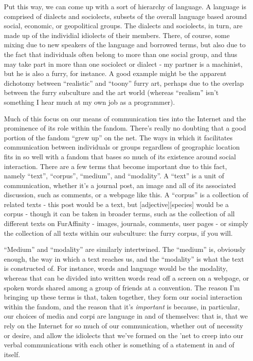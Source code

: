 Put this way, we can come up with a sort of hierarchy of language. A
language is comprised of dialects and sociolects, subsets of the overall
language based around social, economic, or geopolitical groups. The
dialects and sociolects, in turn, are made up of the individial
idiolects of their members. There, of course, some mixing due to new
speakers of the language and borrowed terms, but also due to the fact
that individuals often belong to more than one social group, and thus
may take part in more than one sociolect or dialect - my partner is a
machinist, but he is also a furry, for instance. A good example might be
the apparent dichotomy between ``realistic'' and ``toony'' furry art,
perhaps due to the overlap between the furry subculture and the art
world (whereas ``realism'' isn't something I hear much at my own job as
a programmer).

Much of this focus on our means of communication ties into the Internet
and the prominence of its role within the fandom. There's really no
doubting that a good portion of the fandom ``grew up'' on the net. The
ways in which it facilitates communication between individuals or groups
regardless of geographic location fits in so well with a fandom that
bases so much of its existence around social interaction. There are a
few terms that become important due to this fact, namely ``text'',
``corpus'', ``medium'', and ``modality''. A ``text'' is a unit of
communication, whether it's a journal post, an image and all of its
associated discussion, such as comments, or a webpage like this. A
``corpus'' is a collection of related texts - this post would be a text,
but {[}adjective{]}{[}species{]} would be a corpus - though it can be
taken in broader terms, such as the collection of all different texts on
FurAffinity - images, journals, comments, user pages - or simply the
collection of all texts within our subculture: the furry corpus, if you
will.

``Medium'' and ``modality'' are similarly intertwined. The ``medium''
is, obviously enough, the way in which a text reaches us, and the
``modality'' is what the text is constructed of. For instance, words and
language would be the modality, whereas that can be divided into written
words read off a screen on a webpage, or spoken words shared among a
group of friends at a convention. The reason I'm bringing up these terms
is that, taken together, they form our social interaction within the
fandom, and the reason that it's \emph{important} is because, in
particular, our choices of media and corpi are language in and of
themselves: that is, that we rely on the Internet for so much of our
communication, whether out of necessity or desire, and allow the
idiolects that we've formed on the 'net to creep into our verbal
communications with each other is something of a statement in and of
itself.

